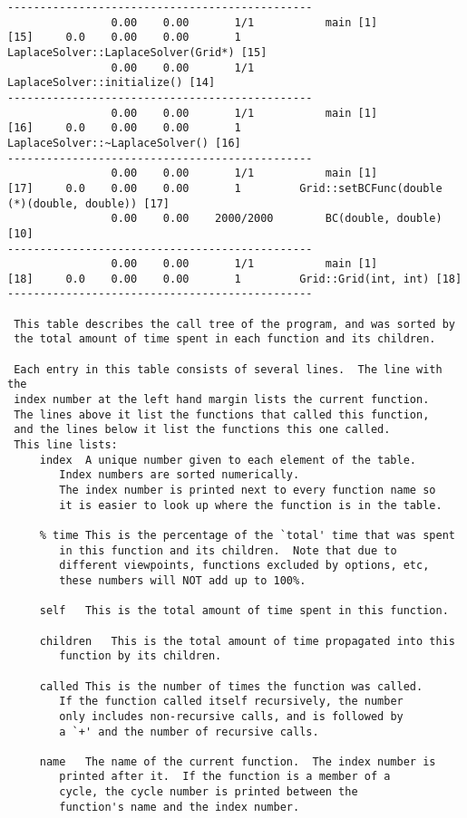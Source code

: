 \documentclass[a4paper,twosidep]{article}
\begin{document}
\begin{verbatim}
-----------------------------------------------
                0.00    0.00       1/1           main [1]
[15]     0.0    0.00    0.00       1         LaplaceSolver::LaplaceSolver(Grid*) [15]
                0.00    0.00       1/1           LaplaceSolver::initialize() [14]
-----------------------------------------------
                0.00    0.00       1/1           main [1]
[16]     0.0    0.00    0.00       1         LaplaceSolver::~LaplaceSolver() [16]
-----------------------------------------------
                0.00    0.00       1/1           main [1]
[17]     0.0    0.00    0.00       1         Grid::setBCFunc(double (*)(double, double)) [17]
                0.00    0.00    2000/2000        BC(double, double) [10]
-----------------------------------------------
                0.00    0.00       1/1           main [1]
[18]     0.0    0.00    0.00       1         Grid::Grid(int, int) [18]
-----------------------------------------------

 This table describes the call tree of the program, and was sorted by
 the total amount of time spent in each function and its children.

 Each entry in this table consists of several lines.  The line with the
 index number at the left hand margin lists the current function.
 The lines above it list the functions that called this function,
 and the lines below it list the functions this one called.
 This line lists:
     index	A unique number given to each element of the table.
		Index numbers are sorted numerically.
		The index number is printed next to every function name so
		it is easier to look up where the function is in the table.

     % time	This is the percentage of the `total' time that was spent
		in this function and its children.  Note that due to
		different viewpoints, functions excluded by options, etc,
		these numbers will NOT add up to 100%.

     self	This is the total amount of time spent in this function.

     children	This is the total amount of time propagated into this
		function by its children.

     called	This is the number of times the function was called.
		If the function called itself recursively, the number
		only includes non-recursive calls, and is followed by
		a `+' and the number of recursive calls.

     name	The name of the current function.  The index number is
		printed after it.  If the function is a member of a
		cycle, the cycle number is printed between the
		function's name and the index number.



\end{verbatim}
\end{document}
